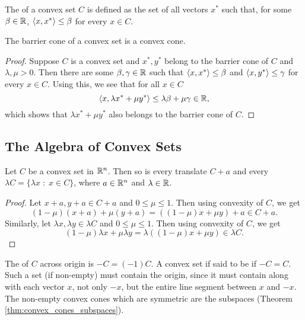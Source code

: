 \documentclass[11pt,a4paper]{article}
\begin{document}
\begin{definition}
    The  of a convex set $C$ is defined as the set of all vectors $x^*$ such that, for some $\beta\in\mathbb{R}$, $\langle x, x^* \rangle\le \beta$ for every $x\in C$.
\end{definition}

\begin{proposition}
    The barrier cone of a convex set is a convex cone.
\end{proposition}

\begin{proof}
    Suppose $C$ is a convex set and $x^*,y^*$ belong to the barrier cone of $C$ and $\lambda,\mu>0$. Then there are some $\beta,\gamma\in \mathbb{R}$ such that $\langle x, x^* \rangle\le \beta$ and $\langle x, y^* \rangle\le \gamma$ for every $x\in C$. Using this, we see that for all $x\in C$
    \begin{equation*}
        \langle x, \lambda x^*+\mu y^* \rangle\le \lambda \beta + \mu \gamma \in \mathbb{R},
    \end{equation*}
    which shows that $\lambda x^*+\mu y^*$ also belongs to the barrier cone of $C$.
\end{proof}

\subsection{The Algebra of Convex Sets}

\begin{theorem}
    Let $C$ be a convex set in $\mathbb{R}^n$. Then so is every translate $C+a$ and every  $\lambda C = \{\lambda x\;:\; x\in C\}$, where $a\in \mathbb{R}^n$ and $\lambda \in \mathbb{R}$.
\end{theorem}

\begin{proof}
    Let $x+a,y+a\in C+a$ and $0\le \mu\le 1$. Then using convexity of $C$, we get
    \begin{equation*}
        (1-\mu) (x+a) + \mu (y+a) = ((1-\mu) x + \mu y) + a\in C+a.
    \end{equation*}
    Similarly, let $\lambda x,\lambda y\in \lambda C$ and $0\le \mu\le 1$. Then using convexity of $C$, we get
    \begin{equation*}
        (1-\mu) \lambda x + \mu \lambda y = \lambda ((1-\mu) x + \mu y) \in \lambda C.
    \end{equation*}
\end{proof}

\begin{remark}
    The  of $C$ across origin is $-C = (-1)C.$ A convex set if said to be  if $-C = C$. Such a set (if non-empty) must contain the origin, since it must contain along with each vector $x$, not only $-x$, but the entire line segment between $x$ and $-x$. The non-empty convex cones which are symmetric are the subspaces (Theorem \ref{thm:convex_cones_subspaces}).
\end{remark}
\end{document}
